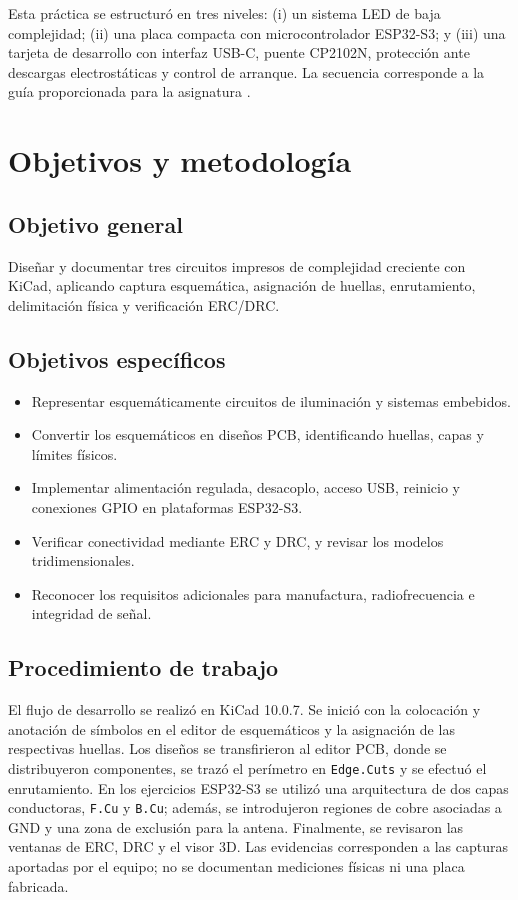 \documentclass[journal,10pt]{IEEEtran}
\begin{document}
Esta práctica se estructuró en tres niveles: (i) un sistema LED de baja complejidad; (ii) una placa compacta con microcontrolador ESP32-S3; y (iii) una tarjeta de desarrollo con interfaz USB-C, puente CP2102N, protección ante descargas electrostáticas y control de arranque. La secuencia corresponde a la guía proporcionada para la asignatura \cite{guia}.

\section{Objetivos y metodología}
\subsection{Objetivo general}
Diseñar y documentar tres circuitos impresos de complejidad creciente con KiCad, aplicando captura esquemática, asignación de huellas, enrutamiento, delimitación física y verificación ERC/DRC.

\subsection{Objetivos específicos}
\begin{itemize}
\item Representar esquemáticamente circuitos de iluminación y sistemas embebidos.
\item Convertir los esquemáticos en diseños PCB, identificando huellas, capas y límites físicos.
\item Implementar alimentación regulada, desacoplo, acceso USB, reinicio y conexiones GPIO en plataformas ESP32-S3.
\item Verificar conectividad mediante ERC y DRC, y revisar los modelos tridimensionales.
\item Reconocer los requisitos adicionales para manufactura, radiofrecuencia e integridad de señal.
\end{itemize}

\subsection{Procedimiento de trabajo}
El flujo de desarrollo se realizó en KiCad 10.0.7. Se inició con la colocación y anotación de símbolos en el editor de esquemáticos y la asignación de las respectivas huellas. Los diseños se transfirieron al editor PCB, donde se distribuyeron componentes, se trazó el perímetro en \texttt{Edge.Cuts} y se efectuó el enrutamiento. En los ejercicios ESP32-S3 se utilizó una arquitectura de dos capas conductoras, \texttt{F.Cu} y \texttt{B.Cu}; además, se introdujeron regiones de cobre asociadas a GND y una zona de exclusión para la antena. Finalmente, se revisaron las ventanas de ERC, DRC y el visor 3D. Las evidencias corresponden a las capturas aportadas por el equipo; no se documentan mediciones físicas ni una placa fabricada.
\end{document}
